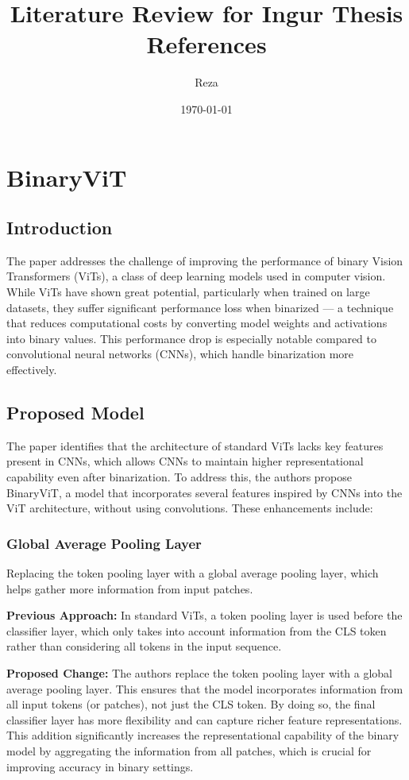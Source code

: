 \documentclass{report}
\title{Literature Review for Ingur Thesis References}
\author{Reza}
\date{\today}
\begin{document}
	
	\maketitle
	\tableofcontents
		
	\chapter{BinaryViT \cite{le2023binaryvit}}
	
	\section{Introduction}
	The paper addresses the challenge of improving the performance of binary Vision Transformers (ViTs), a class of deep learning models used in computer vision. While ViTs have shown great potential, particularly when trained on large datasets, they suffer significant performance loss when binarized — a technique that reduces computational costs by converting model weights and activations into binary values. This performance drop is especially notable compared to convolutional neural networks (CNNs), which handle binarization more effectively.
	
	
	\section{Proposed Model}
	The paper identifies that the architecture of standard ViTs lacks key features present in CNNs, which allows CNNs to maintain higher representational capability even after binarization. To address this, the authors propose BinaryViT, a model that incorporates several features inspired by CNNs into the ViT architecture, without using convolutions. These enhancements include:
	
	\subsection{Global Average Pooling Layer}
	Replacing the token pooling layer with a global average pooling layer, which helps gather more information from input patches.
	
	\textbf{Previous Approach:} In standard ViTs, a token pooling layer is used before the classifier layer, which only takes into account information from the CLS token rather than considering all tokens in the input sequence.
	
	\textbf{Proposed Change:} The authors replace the token pooling layer with a global average pooling layer. This ensures that the model incorporates information from all input tokens (or patches), not just the CLS token. By doing so, the final classifier layer has more flexibility and can capture richer feature representations. This addition significantly increases the representational capability of the binary model by aggregating the information from all patches, which is crucial for improving accuracy in binary settings.
	
\end{document}
